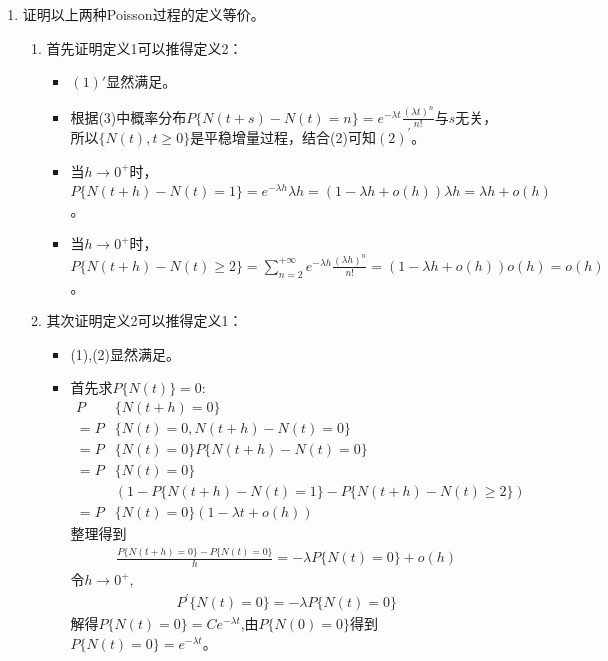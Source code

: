 \begin{enumerate}
	\item 证明以上两种Poisson过程的定义等价。
	      \begin{enumerate}[\bfseries 1)]
		      \item 首先证明定义1可以推得定义2：
		            \begin{itemize}

			            \item \((1){\prime}\)显然满足。

			            \item 根据(3)中概率分布\(P\{N(t+s)-N(t)=n\}=e^{-\lambda t}\frac{(\lambda t)^n}{n!}\)与\(s\)无关，所以\(\{N(t),t\geqslant 0\}\)是平稳增量过程，结合(2)可知\((2)^{\prime}\)。

			            \item 当\(h\to 0^+\)时，\(P\{N(t+h)-N(t)=1\}=e^{-\lambda h}\lambda h=(1-\lambda h+o(h))\lambda h=\lambda h+o(h)\)。

			            \item 当\(h\to 0^+\)时，\(P\{N(t+h)-N(t)\geqslant 2\}=\sum_{n=2}^{+\infty}e^{-\lambda h}\frac{(\lambda h)^n}{n!}=(1-\lambda h+o(h))o(h)=o(h)\)。

		            \end{itemize}
		      \item 其次证明定义2可以推得定义1：
		            \begin{itemize}

			            \item (1),(2)显然满足。

			            \item 首先求\(P\{N(t)\}=0\):
			                  \begin{align*}
				                  P  & \{N(t+h)=0\}                                       \\
				                  =P & \{N(t)=0,N(t+h)-N(t)=0\}                           \\
				                  =P & \{N(t)=0\}P\{N(t+h)-N(t)=0\}                       \\
				                  =P & \{N(t)=0\}                                         \\
				                     & (1-P\{N(t+h)-N(t)=1\}-P\{N(t+h)-N(t)\geqslant 2\}) \\
				                  =P & \{N(t)=0\}(1-\lambda t +o(h))
			                  \end{align*}
			                  整理得到
			                  \begin{align*}
				                  \frac{P\{N(t+h)=0\}-P\{N(t)=0\}}{h}=-\lambda P\{N(t)=0\} +o(h)
			                  \end{align*}
			                  令\(h\to 0^+\),
			                  \begin{align*}
				                  P^{\prime}\{N(t)=0\}=-\lambda P\{N(t)=0\}
			                  \end{align*}
			                  解得\(P\{N(t)=0\}=C e^{-\lambda t}\),由\(P\{N(0)=0\}\)得到\(P\{N(t)=0\}=e^{-\lambda t}\)。


\end{itemize}
\end{enumerate}
\end{enumerate}
